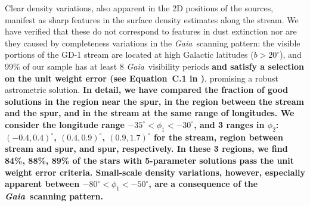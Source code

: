 \documentclass[modern]{aastex62}
\newcommand{\gaia}{\textsl{Gaia}}
\newcommand{\changes}[1]{{\textbf{#1}}}
\begin{document}
Clear density variations, also apparent in the 2D positions of the sources, manifest as sharp features in the surface density estimates along the stream.
We have verified that these do not correspond to features in dust extinction nor are they caused by completeness variations in the \gaia\ scanning pattern:
the visible portions of the GD-1 stream are located at high Galactic latitudes ($b > 20^\circ$), and 99\% of our sample has at least 8 \gaia\ visibility periods \changes{and satisfy a selection on the unit weight error (see Equation~C.1 in \citealt{Lindegren:2018})}, promising a robust astrometric solution.
\changes{
In detail, we have compared the fraction of good solutions in the region near the spur, in the region between the stream and the spur, and in the stream at the same range of longitudes.
We consider the longitude range $-35^\circ < \phi_1 < -30^\circ$, and 3 ranges in $\phi_2$: $(-0.4, 0.4)^\circ$, $(0.4, 0.9)^\circ$, $(0.9, 1.7)^\circ$ for the stream, region between stream and spur, and spur, respectively.
In these 3 regions, we find 84\%, 88\%, 89\% of the stars with 5-parameter solutions pass the unit weight error criteria.
Small-scale density variations, however, especially apparent between $-80^\circ < \phi_1 < -50^\circ$, are a consequence of the \gaia\ scanning pattern.
}
\end{document}

